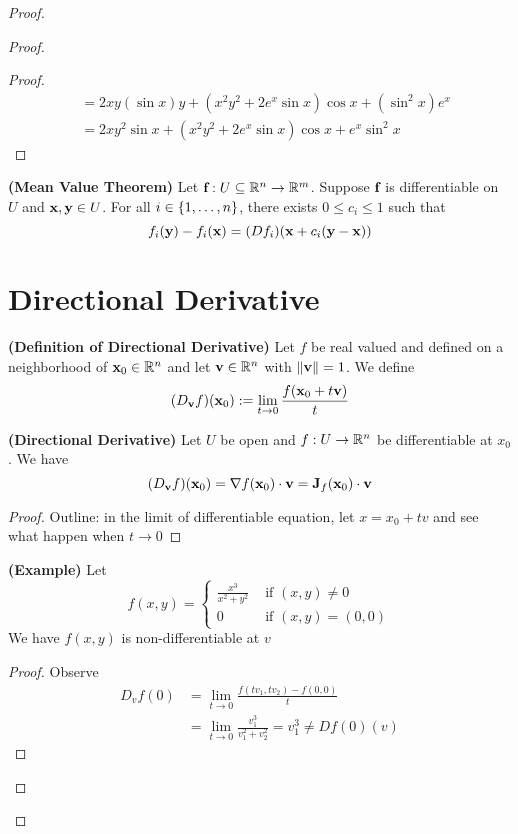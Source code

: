\documentclass{report}
\begin{document}
\begin{proof}
\begin{proof}
\begin{proof}
\begin{align}
  &=2xy(\sin x)y+(x^2y^2+2e^x \sin x)\cos x+(\sin^2 x)e^x\\
  &=2xy^2\sin x+(x^2y^2+2e^x\sin x) \cos x+ e^x\sin^2 x
\end{align}
\end{proof}
\begin{theorem}
\label{5.3.7}
\textbf{(Mean Value Theorem)} Let $\textbf{f}:U\subseteq \mathbb{R}^n\rightarrow \mathbb{R}^m$. Suppose $\textbf{f}$ is differentiable on $U$ and $\textbf{x},\textbf{y}\in U$. For all $i\in \{ 1,\dots , n \}$, there exists $0\leq c_i\leq 1$ such that 
\begin{equation}
f_i(\textbf{y})-f_i(\textbf{x})=(Df_i)(\textbf{x}+c_i(\textbf{y}-\textbf{x}))
\end{equation}
\end{theorem}
\section{Directional Derivative}
\begin{definition}
\label{5.4.1}
  \textbf{(Definition of Directional Derivative)} Let $f$ be real valued and defined on a neighborhood of $\textbf{x}_0 \in\mathbb{R}^n$ and let $\textbf{v}\in\mathbb{R}^n$ with $\| \textbf{v} \|=1$. We define 
  \begin{equation}
    (D_{\textbf{v}}f)(\textbf{x}_0):=\lim_{t\to 0}\frac{f(\textbf{x}_0+t\textbf{v})}{t}
  \end{equation}
\end{definition}
\begin{theorem}
\label{5.4.2}
\textbf{(Directional Derivative)} Let $U$ be open and $f:U\rightarrow \mathbb{R}^n$ be differentiable at $x_0$. We have
 \begin{equation}
   (D_{\textbf{v}}f)(\textbf{x}_0)=\nabla f(\textbf{x}_0)\cdot \textbf{v}=\textbf{J}_f(\textbf{x}_0)\cdot \textbf{v}
\end{equation}
\end{theorem}
\begin{proof}
Outline: in the limit of differentiable equation, let $x=x_0+tv$ and see what happen when  $t \to 0$
\end{proof}
\begin{theorem}
\label{5.4.3}
\textbf{(Example)} Let
\begin{equation}
f(x,y)=\begin{cases}
  \frac{x^3}{x^2+y^2}& \text{ if  }(x,y)\neq 0\\
  0 & \text{ if  }(x,y)=(0,0)
\end{cases}
\end{equation}
We have $f(x,y)$ is non-differentiable at $v$
\end{theorem}
\begin{proof}
Observe
\begin{align}
D_vf(0)&=\lim_{t \to 0}\frac{f(tv_1,tv_2)-f(0,0)}{t}\\
&=\lim_{t\to0}\frac{v_1^3}{v_1^2+v_2^2}=v_1^3\neq Df(0)(v)
\end{align}
\end{proof}

\end{proof}
\end{proof}
\end{document}
